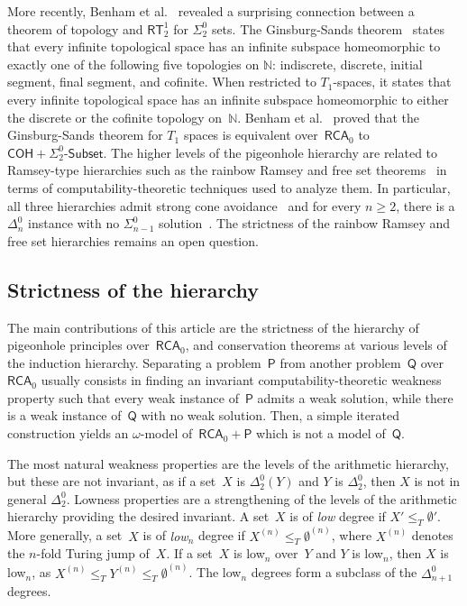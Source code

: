 \documentclass{article}
\def\NN{\mathbb{N}}
\def\Psf{\mathsf{P}}
\def\Qsf{\mathsf{Q}}
\newcommand{\Sub}[1]{{#1}\mbox{-}\mathsf{Subset}}
\newcommand{\RCA}{\mathsf{RCA}}
\newcommand{\COH}{\mathsf{COH}}
\newcommand{\RT}{\mathsf{RT}}
\numberwithin{theorem}{section}
\theoremstyle{definition}
\begin{document}
More recently, Benham et al.~\cite{benham2024ginsburg} revealed a surprising connection between a theorem of topology and $\RT^1_2$ for $\Sigma^0_2$ sets. The Ginsburg-Sands theorem~\cite{ginsburg1979minimal} states that every infinite topological space has an infinite subspace homeomorphic to exactly one of the following five topologies on $\NN$: indiscrete, discrete, initial segment, final segment, and cofinite. When restricted to $T_1$-spaces, it states that every infinite topological space has an infinite subspace homeomorphic to either the discrete or the cofinite topology on~$\NN$. Benham et al.~\cite{benham2024ginsburg} proved that the Ginsburg-Sands theorem for $T_1$ spaces is equivalent over~$\RCA_0$ to $\COH + \Sub{\Sigma^0_2}$. The higher levels of the pigeonhole hierarchy are related to Ramsey-type hierarchies such as the rainbow Ramsey and free set theorems~\cite{csima2009strength,wang2014some} in terms of computability-theoretic techniques used to analyze them. In particular, all three hierarchies admit strong cone avoidance~\cite{dzhafarov2009ramsey,wang2014some} and for every $n \geq 2$, there is a $\Delta^0_n$ instance with no $\Sigma^0_{n-1}$ solution~\cite{jockuschRamseyTheoremRecursion1972,cholakFreeSetsReverse2001,csima2009strength}.
The strictness of the rainbow Ramsey and free set hierarchies remains an open question.

\subsection{Strictness of the hierarchy}

The main contributions of this article are the strictness of the hierarchy of pigeonhole principles over~$\RCA_0$,
and conservation theorems at various levels of the induction hierarchy. Separating a problem~$\Psf$ from another problem~$\Qsf$ over~$\RCA_0$ usually consists in finding an invariant computability-theoretic weakness property such that every weak instance of~$\Psf$ admits a weak solution, while there is a weak instance of~$\Qsf$ with no weak solution. Then, a simple iterated construction yields an $\omega$-model of~$\RCA_0 + \Psf$ which is not a model of~$\Qsf$.

The most natural weakness properties are the levels of the arithmetic hierarchy, but these are not invariant, as if a set~$X$ is $\Delta^0_2(Y)$ and $Y$ is $\Delta^0_2$, then $X$ is not in general $\Delta^0_2$. Lowness properties are a strengthening of the levels of the arithmetic hierarchy providing the desired invariant. A set~$X$ is of \emph{low} degree if $X' \leq_T \emptyset'$. More generally, a set~$X$ is of \emph{low${}_n$} degree if $X^{(n)} \leq_T \emptyset^{(n)}$, where $X^{(n)}$ denotes the $n$-fold Turing jump of~$X$. If a set~$X$ is low${}_n$ over~$Y$ and $Y$ is low${}_n$, then $X$ is low${}_n$, as $X^{(n)} \leq_T Y^{(n)} \leq_T \emptyset^{(n)}$. The low${}_n$ degrees form a subclass of the $\Delta^0_{n+1}$ degrees.
\end{document}
